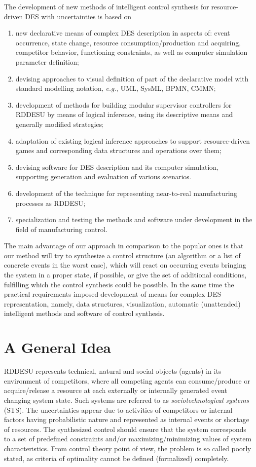 \documentclass[conference,a4paper]{IEEEtran}
\begin{document}
The development of new methods of intelligent control synthesis for resource-driven DES with uncertainties is based on
\begin{enumerate}
\item new declarative means of complex DES description in aspects of: event occurrence, state change, resource consumption/production and acquiring, competitor behavior, functioning constraints, as well as computer simulation parameter definition;
\item devising approaches to visual definition of part of the declarative model with standard modelling notation, \emph{e.g.}, UML, SysML, BPMN, CMMN;
\item development of methods for building modular supervisor controllers for RDDESU by means of logical inference, using its descriptive means and generally modified strategies;
\item adaptation of existing logical inference approaches to support resource-driven games and corresponding data structures and operations over them;
\item devising software for DES description and its computer simulation, supporting generation and evaluation of various scenarios.
\item development of the technique for representing near-to-real manufacturing processes as RDDESU;
\item specialization and testing the methods and software under development in the field of manufacturing control.
\end{enumerate}

The main advantage of our approach in comparison to the popular ones is that our method will try to synthesize a control structure (an algorithm or a list of concrete events in the worst case), which will react on occurring events bringing the system in a proper state, if possible, or give the set of additional conditions, fulfilling which the control synthesis could be possible. In the same time the practical requirements imposed development of means for complex DES representation, namely, data structures, visualization, automatic (unattended) intelligent methods and software of control synthesis.

\section{A General Idea}
\label{sec:idea}

RDDESU represents technical, natural and social objects (agents) in its environment of competitors, where all competing agents can consume/produce or acquire/release a resource at each externally or internally generated event changing system state.  Such systems are referred to as \emph{sociotechnological systems} (STS).  The uncertainties appear due to activities of competitors or internal factors having probabilistic nature and represented as internal events or shortage of resources. The synthesized control should ensure that the system corresponds to a set of predefined constraints and/or maximizing/minimizing values of system characteristics.  From control theory point of view, the problem is so called poorly stated, as criteria of optimality cannot be defined (formalized) completely.
\end{document}
